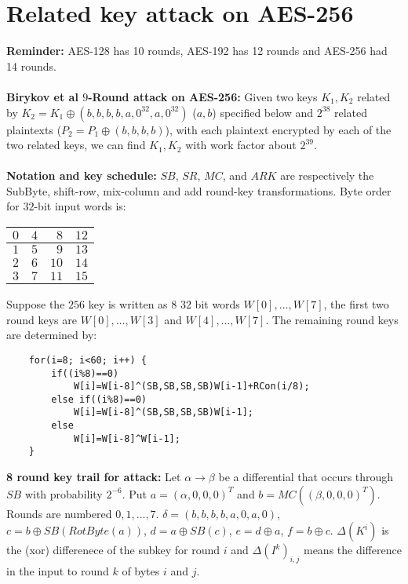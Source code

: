 \section{Related key attack on AES-256}
{\bf Reminder:} AES-128 has 10 rounds, AES-192 has 12 rounds and AES-256 had 14 rounds.
\\
\\
{\bf Birykov et al $9$-Round attack on AES-256:}
Given
two keys $K_1, K_2$ related by $K_2= K_1 \oplus (b,b,b,b,a,0^{32},a,0^{32})$ ($a, b$) specified
below and $2^{38}$ related plaintexts ($P_2= P_1 \oplus (b,b,b,b)$), with each plaintext
encrypted by each of the two related keys, we can find $K_1, K_2$ with work factor about $2^{39}$.
\\
\\
{\bf Notation and key schedule:}  $SB$, $SR$, $MC$, and $ARK$ are respectively the SubByte,
shift-row, mix-column and add round-key transformations.  Byte order for $32$-bit input words is:
\begin{center}
\begin{tabular} {|r|r|r|r|}
\hline
$0$ & $4$ & $8$ & $12$ \\
\hline
$1$ & $5$ & $9$ & $13$ \\
\hline
$2$ & $6$ & $10$ & $14$ \\
\hline
$3$ & $7$ & $11$ & $15$ \\
\hline
\end{tabular}
\end{center}
Suppose the $256$ key is written as $8$ $32$ bit words $W[0], \ldots, W[7]$, the first
two round keys are 
$W[0], \ldots, W[3]$ and
$W[4], \ldots, W[7]$.  The remaining round keys are determined by:
\begin{verbatim}
    for(i=8; i<60; i++) {
        if((i%8)==0)
            W[i]=W[i-8]^(SB,SB,SB,SB)W[i-1]+RCon(i/8);
        else if((i%8)==0)
            W[i]=W[i-8]^(SB,SB,SB,SB)W[i-1];
        else
            W[i]=W[i-8]^W[i-1];
    }
\end{verbatim}
{\bf 8 round key trail for attack:} Let $\alpha \rightarrow \beta$ be a differential
that occurs through $SB$ with probability $2^{-6}$.  Put 
$a=(\alpha,0,0,0)^T$ and
$b=MC((\beta,0,0,0)^T)$.  Rounds are numbered $0, 1, \ldots ,7$.
$\delta= (b,b,b,b,a,0,a,0)$, $c= b \oplus SB(RotByte(a))$, $d= a \oplus SB(c)$, $e= d \oplus a$,
$f=b \oplus c$.  $\Delta(K^i)$ is the (xor) differenece of the subkey for round $i$ and
$\Delta(I^k)_{i,j}$ means the difference in the input to round $k$ of bytes $i$ and $j$.
\\
